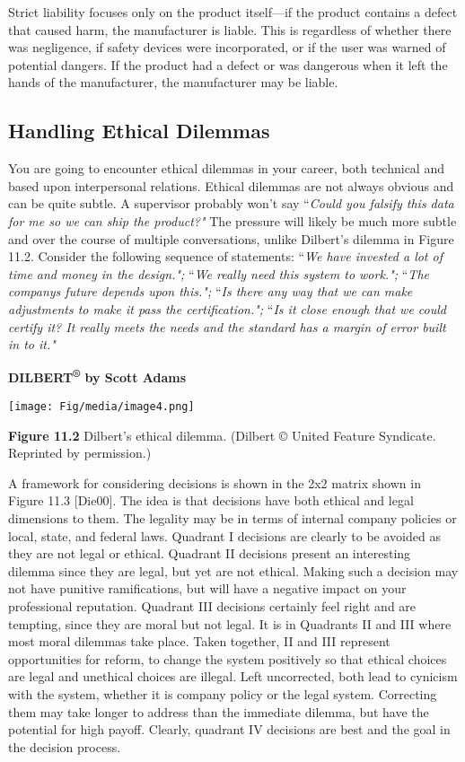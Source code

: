Strict liability focuses only on the product itself---if the product
contains a defect that caused harm, the manufacturer is liable. This is
regardless of whether there was negligence, if safety devices were
incorporated, or if the user was warned of potential dangers. If the
product had a defect or was dangerous when it left the hands of the
manufacturer, the manufacturer may be liable.

\subsection{Handling Ethical Dilemmas}\label{handling-ethical-dilemmas}

You are going to encounter ethical dilemmas in your career, both
technical and based upon interpersonal relations. Ethical dilemmas are
not always obvious and can be quite subtle. A supervisor probably won't
say ``\emph{Could you falsify this data for me so we can ship the
product?"} The pressure will likely be much more subtle and over the
course of multiple conversations, unlike Dilbert's dilemma in Figure
11.2. Consider the following sequence of statements: ``\emph{We have
invested a lot of time and money in the design.";} ``\emph{We really
need this system to work.";} ``\emph{The company\textquotesingle s
future depends upon this.";} ``\emph{Is there any way that we can make
adjustments to make it pass the certification.";} ``\emph{Is it close
enough that we could certify it? It really meets the needs and the
standard has a margin of error built in to it."}

\textbf{DILBERT\textsuperscript{®} by Scott Adams}

\texttt{[image: Fig/media/image4.png]}

\textbf{Figure 11.2} Dilbert's ethical dilemma. (Dilbert © United
Feature Syndicate. Reprinted by permission.)

A framework for considering decisions is shown in the 2x2 matrix shown
in Figure 11.3 {[}Die00{]}. The idea is that decisions have both ethical
and legal dimensions to them. The legality may be in terms of internal
company policies or local, state, and federal laws. Quadrant I decisions
are clearly to be avoided as they are not legal or ethical. Quadrant II
decisions present an interesting dilemma since they are legal, but yet
are not ethical. Making such a decision may not have punitive
ramifications, but will have a negative impact on your professional
reputation. Quadrant III decisions certainly feel right and are
tempting, since they are moral but not legal. It is in Quadrants II and
III where most moral dilemmas take place. Taken together, II and III
represent opportunities for reform, to change the system positively so
that ethical choices are legal and unethical choices are illegal. Left
uncorrected, both lead to cynicism with the system, whether it is
company policy or the legal system. Correcting them may take longer to
address than the immediate dilemma, but have the potential for high
payoff. Clearly, quadrant IV decisions are best and the goal in the
decision process.


